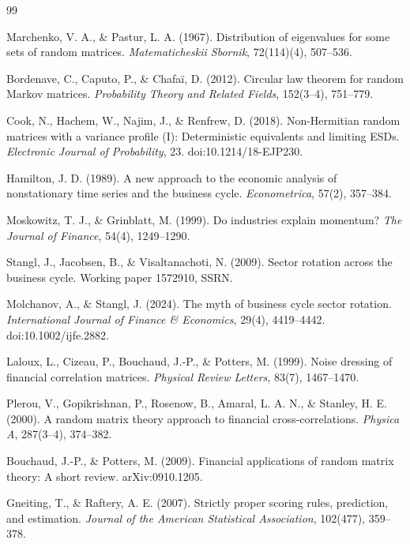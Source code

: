 \documentclass[11pt]{article}
\begin{document}
\clearpage
\begin{thebibliography}{99}

Marchenko, V. A., \& Pastur, L. A. (1967).
Distribution of eigenvalues for some sets of random matrices.
\textit{Matematicheskii Sbornik}, 72(114)(4), 507--536.

Bordenave, C., Caputo, P., \& Chafa\"i, D. (2012).
Circular law theorem for random Markov matrices.
\textit{Probability Theory and Related Fields}, 152(3--4), 751--779.

Cook, N., Hachem, W., Najim, J., \& Renfrew, D. (2018).
Non-Hermitian random matrices with a variance profile (I): Deterministic equivalents and limiting ESDs.
\textit{Electronic Journal of Probability}, 23. doi:10.1214/18-EJP230.

Hamilton, J. D. (1989).
A new approach to the economic analysis of nonstationary time series and the business cycle.
\textit{Econometrica}, 57(2), 357--384.

Moskowitz, T. J., \& Grinblatt, M. (1999).
Do industries explain momentum?
\textit{The Journal of Finance}, 54(4), 1249--1290.

Stangl, J., Jacobsen, B., \& Visaltanachoti, N. (2009).
Sector rotation across the business cycle.
Working paper 1572910, SSRN.

Molchanov, A., \& Stangl, J. (2024).
The myth of business cycle sector rotation.
\textit{International Journal of Finance \& Economics}, 29(4), 4419--4442. doi:10.1002/ijfe.2882.

Laloux, L., Cizeau, P., Bouchaud, J.-P., \& Potters, M. (1999).
Noise dressing of financial correlation matrices.
\textit{Physical Review Letters}, 83(7), 1467--1470.

Plerou, V., Gopikrishnan, P., Rosenow, B., Amaral, L. A. N., \& Stanley, H. E. (2000).
A random matrix theory approach to financial cross-correlations.
\textit{Physica A}, 287(3--4), 374--382.

Bouchaud, J.-P., \& Potters, M. (2009).
Financial applications of random matrix theory: A short review.
arXiv:0910.1205.

Gneiting, T., \& Raftery, A. E. (2007).
Strictly proper scoring rules, prediction, and estimation.
\textit{Journal of the American Statistical Association}, 102(477), 359--378.


\end{thebibliography}
\end{document}
